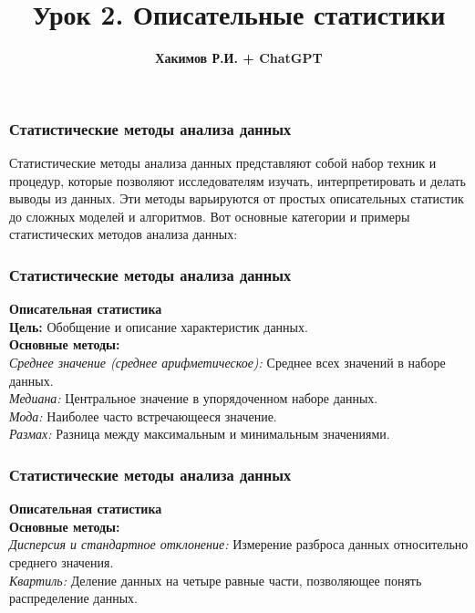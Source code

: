 \documentclass[aspectratio=169]{beamer}
\title{\bf Урок 2. Описательные статистики}
\author{{\bf Хакимов Р.И. + ChatGPT}}
\date[\today]{}
\begin{document}
\begin{frame}
\titlepage
\end{frame}

\begin{frame}
\frametitle{Статистические методы анализа данных}
Статистические методы анализа данных представляют собой набор техник и процедур, которые позволяют исследователям изучать, интерпретировать и делать выводы из данных. Эти методы варьируются от простых описательных статистик до сложных моделей и алгоритмов. Вот основные категории и примеры статистических методов анализа данных:
\newline\\
\end{frame}

\begin{frame}
\frametitle{Статистические методы анализа данных}
\textbf{Описательная статистика}
\newline\\
\textbf{Цель:} Обобщение и описание характеристик данных.
\newline\\
\textbf{Основные методы:}
\newline\\
\textit{Среднее значение (среднее арифметическое):} Среднее всех значений в наборе данных.
\newline\\
\textit{Медиана:} Центральное значение в упорядоченном наборе данных.
\newline\\
\textit{Мода:} Наиболее часто встречающееся значение.
\newline\\
\textit{Размах:} Разница между максимальным и минимальным значениями.
\end{frame}

\begin{frame}
\frametitle{Статистические методы анализа данных}
\textbf{Описательная статистика}
\newline\\
\textbf{Основные методы:}
\newline\\
\textit{Дисперсия и стандартное отклонение:} Измерение разброса данных относительно среднего значения.
\newline\\
\textit{Квартиль:} Деление данных на четыре равные части, позволяющее понять распределение данных.
\end{frame}
\end{document}
